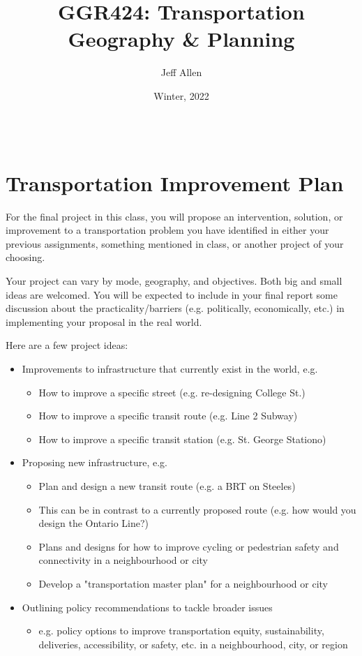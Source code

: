 \documentclass[11pt]{article}
\title{\textbf{GGR424: Transportation Geography \& Planning}}
\author{Jeff Allen}
\date{Winter, 2022}
\begin{document}
	
	\allsectionsfont{\sffamily}
	
	\section*{\\Transportation Improvement Plan}
	
	
	For the final project in this class, you will propose an intervention, solution, or improvement to a transportation problem you have identified in either your previous assignments, something mentioned in class, or another project of your choosing. 
	
	Your project can vary by mode, geography, and objectives. Both big and small ideas are welcomed. You will be expected to include in your final report some discussion about the practicality/barriers (e.g. politically, economically, etc.) in implementing your proposal in the real world.
	
	Here are a few project ideas:
	\begin{itemize}
		\item Improvements to infrastructure that currently exist in the world, e.g.
		\begin{itemize}
			\item How to improve a specific street (e.g. re-designing College St.)
			\item How to improve a specific transit route (e.g. Line 2 Subway)
			\item How to improve a specific transit station (e.g. St. George Stationo)
		\end{itemize}
		\item Proposing new infrastructure, e.g.
		\begin{itemize}
			\item Plan and design a new transit route (e.g. a BRT on Steeles)
			\item This can be in contrast to a currently proposed route (e.g. how would you design the Ontario Line?)
			\item Plans and designs for how to improve cycling or pedestrian safety and connectivity in a neighbourhood or city
			\item Develop a "transportation master plan" for a neighbourhood or city
		\end{itemize}
		\item Outlining policy recommendations to tackle broader issues
		\begin{itemize}
			\item e.g. policy options to improve transportation equity, sustainability, deliveries, accessibility, or safety, etc. in a neighbourhood, city, or region
		\end{itemize}
	\end{itemize}
	
\end{document}
